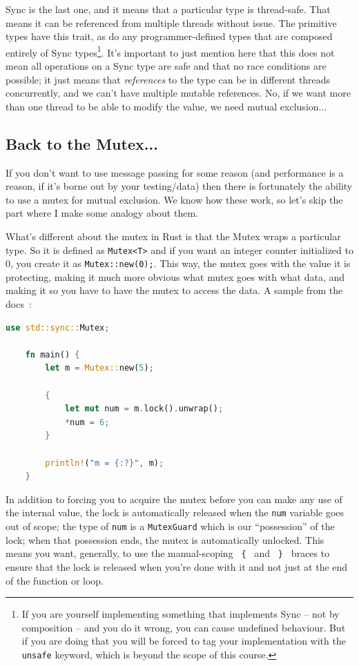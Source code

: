 Sync is the last one, and it means that a particular type is thread-safe. That means it can be referenced from multiple threads without issue. The primitive types have this trait, as do any programmer-defined types that are composed entirely of Sync types\footnote{If you are yourself implementing something that implements Sync -- not by composition -- and you do it wrong, you can cause undefined behaviour. But if you are doing that you will be forced to tag your implementation with the \texttt{unsafe} keyword, which is beyond the scope of this course.}. It's important to just mention here that this does not mean all operations on a Sync type are safe and that no race conditions are possible; it just means that \textit{references} to the type can be in different threads concurrently, and we can't have multiple mutable references. No, if we want more than one thread to be able to modify the value, we need mutual exclusion...

\subsection*{Back to the Mutex...}
If you don't want to use message passing for some reason (and performance is a reason, if it's borne out by your testing/data) then there is fortunately the ability to use a mutex for mutual exclusion. We know how these work, so let's skip the part where I make some analogy about them. 

What's different about the mutex in Rust is that the Mutex wraps a particular type. So it is defined as \texttt{Mutex<T>} and if you want an integer counter initialized to 0, you create it as \texttt{Mutex::new(0);}. This way, the mutex goes with the value it is protecting, making it much more obvious what mutex goes with what data, and making it so you have to have the mutex to access the data. A sample from the docs~\cite{rustdocs}:

\begin{lstlisting}[language=Rust]
    use std::sync::Mutex;

    fn main() {
        let m = Mutex::new(5);

        {
            let mut num = m.lock().unwrap();
            *num = 6;
        }

        println!("m = {:?}", m);
    }
\end{lstlisting}

In addition to forcing you to acquire the mutex before you can make any use of the internal value, the lock is automatically released when the \texttt{num} variable goes out of scope; the type of \texttt{num} is a \texttt{MutexGuard} which is our ``possession'' of the lock; when that possession ends, the mutex is automatically unlocked. This means you want, generally, to use the manual-scoping \texttt{ \{ } and \texttt{ \} } braces to ensure that the lock is released when you're done with it and not just at the end of the function or loop.

